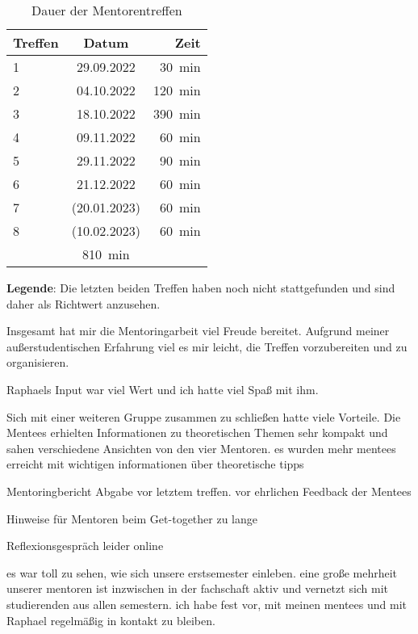 \documentclass[
    paper=a4,
    div=calc,
    numbers=noendperiod,
    twocolumn,
]{scrartcl}
\newcommand{\legend}[1]{\par\footnotesize\textbf{Legende}: #1\par}
\begin{document}
    \begin{table}[htb]
        \centering
        \caption{Dauer der Mentorentreffen}
        \label{tab:time}
        \begin{tabular}{lcr}\toprule
            Treffen &   Datum           &   Zeit\\\midrule
            1       &   29.09.2022      &   \SI{30}{\minute}\\
            2       &   04.10.2022      &   \SI{120}{\minute}\\
            3       &   18.10.2022      &   \SI{390}{\minute}\\
            4       &   09.11.2022      &   \SI{60}{\minute}\\
            5       &   29.11.2022      &   \SI{90}{\minute}\\
            6       &   21.12.2022      &   \SI{60}{\minute}\\
            7       &   (20.01.2023)    &   \SI{60}{\minute}\\
            8       &   (10.02.2023)    &   \SI{60}{\minute}\\
            \addlinespace
            \multicolumn{2}{l}{gesamt}  &   \SI{810}{\minute}\\\bottomrule
        \end{tabular}
        \vspace{0.5em}
        \legend{Die letzten beiden Treffen haben noch nicht stattgefunden und sind daher als Richtwert anzusehen.}
    \end{table}

    Insgesamt hat mir die Mentoringarbeit viel Freude bereitet. Aufgrund meiner außerstudentischen Erfahrung viel es mir leicht, die Treffen vorzubereiten und zu organisieren. 
    
    Raphaels Input war viel Wert  und ich hatte viel Spaß mit ihm. 

    Sich mit einer weiteren Gruppe zusammen zu schließen hatte viele Vorteile. Die Mentees erhielten Informationen zu theoretischen Themen sehr kompakt und sahen verschiedene Ansichten von den vier Mentoren.
    es wurden mehr mentees erreicht mit wichtigen informationen über theoretische tipps

    Mentoringbericht Abgabe vor letztem treffen. vor ehrlichen Feedback der Mentees

    Hinweise für Mentoren beim Get-together zu lange

    Reflexionsgespräch leider online

    es war toll zu sehen, wie sich unsere erstsemester einleben. eine große mehrheit unserer mentoren ist inzwischen in der fachschaft aktiv und vernetzt sich mit studierenden aus allen semestern. 
    ich habe fest vor, mit meinen mentees und mit Raphael regelmäßig in kontakt zu bleiben.
\end{document}
